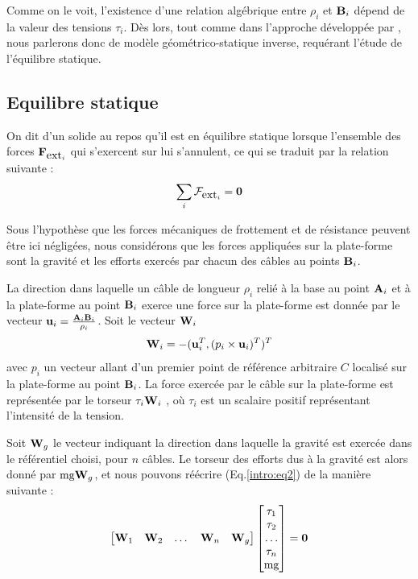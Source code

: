 Comme on le voit, l'existence d'une relation alg\'ebrique entre $\rho_i$ et 
${\bf B}_i$ d\'epend de la valeur des tensions $\tau_i$. Dès lors, tout comme 
dans l'approche développée par \cite{2010:Carricato.Merlet}, nous parlerons donc 
de modèle géométrico-statique inverse, requérant l'étude de l'équilibre 
statique.

\subsection{Equilibre statique} \label{chap0-1-2}

On dit d'un solide au repos qu'il est en équilibre statique lorsque l'ensemble 
des forces $\mathcal {\bf F}_{\hbox{ext}_i}$ qui s'exercent sur lui 
s'annulent, ce qui se traduit par la relation suivante :
\begin{equation}
\sum_i \boldmath {\mathcal F}_{\hbox{ext}_i} = {\bf 0}
\label{intro:eq2}
\end{equation}

Sous l'hypothèse que les forces mécaniques de frottement et de résistance 
peuvent être ici négligées, nous considérons que les forces appliqu\'ees sur la 
plate-forme sont la gravit\'e et les efforts exercés par chacun des câbles au 
points ${\bf B}_i$.

La direction dans laquelle un câble de longueur $\rho_i$ relié à la base au 
point ${\bf A}_i$ et à la plate-forme au point ${\bf B}_i$ exerce une force sur 
la plate-forme est donnée par le vecteur ${\bf u}_i = \frac{{\bf A}_i{\bf 
B}_i}{\rho_i}$. Soit le vecteur ${\bf W}_i$
\begin{equation}
{\bf W}_i = -({\bf u}_i^T, (p_i \times {\bf u}_i)^T)^T
\label{intro:eq3}
\end{equation}
avec $p_i$ un vecteur allant d'un premier point de référence arbitraire 
$C$ localisé sur la plate-forme au point ${\bf B}_i$. La force exercée par le 
câble sur la plate-forme est représentée par le torseur $ \tau_i {\bf W}_i$ , où $\tau_i$ est un 
scalaire positif représentant l'intensité de la tension.

Soit ${\bf W}_g$ le vecteur indiquant la direction dans laquelle la gravité est 
exercée dans le référentiel choisi, pour $n$ câbles. Le torseur des efforts dus à la gravité est alors donné par $\hbox{mg} {\bf W}_g$, et nous pouvons réécrire (Eq.\ref{intro:eq2}) de la manière suivante :
\begin{equation}
\begin{bmatrix}
 {\bf W}_1 & {\bf W}_2 & \dots & {\bf W}_n & {\bf W}_g
\end{bmatrix}
\begin{bmatrix}
 \tau_1 \\ \tau_2 \\ \dots \\ \tau_n \\ \hbox{mg}
\end{bmatrix}
= {\bf 0}
\label{intro:eq4}
\end{equation}

